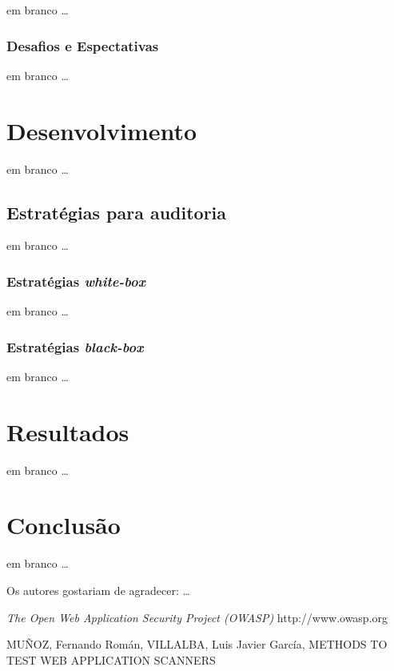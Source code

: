 ﻿\documentclass[twocolumn,showpacs,%
  nofootinbib,aps,superscriptaddress,%
  eqsecnum,prd,notitlepage,showkeys,10pt]{revtex4-1}
\begin{document}
em branco \dots

\subsubsection{Desafios e Espectativas}

em branco \dots

\section{Desenvolvimento}
\label{sec:desenv}

em branco \dots

\subsection{Estratégias para auditoria}

em branco \dots

\subsubsection{Estratégias \emph{white-box}}

em branco \dots

\subsubsection{Estratégias \emph{black-box}}

em branco \dots

\section{Resultados}
\label{sec:resultados}

em branco \dots

\section{Conclusão}
\label{sec:conclusao}

em branco \dots


\begin{acknowledgments}

Os autores gostariam de agradecer:\cite{owasp2013} \dots

\end{acknowledgments}

\begin{thebibliography}{99}

  \emph{The Open Web Application Security Project (OWASP)}
  http://www.owasp.org

  MUÑOZ, Fernando Román, VILLALBA, Luis Javier García, METHODS TO TEST WEB APPLICATION SCANNERS
  
  
\end{thebibliography}
\end{document}
